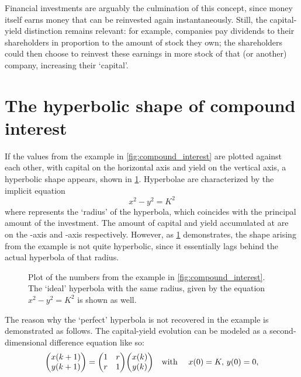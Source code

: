 Financial investments are arguably the culmination of this concept, since money itself earns money that can be reinvested again instantaneously. Still, the capital-yield distinction remains relevant: for example, companies pay dividends to their shareholders in proportion to the amount of stock they own; the shareholders could then choose to reinvest these earnings in more stock of that (or another) company, increasing their `capital'. %

\section{The hyperbolic shape of compound interest}
\label{sec:hyperbolic_interest}
If the values from the example in \cref{fig:compound_interest} are plotted against each other, with capital on the horizontal axis and yield on the vertical axis, a hyperbolic shape appears, shown in \cref{fig:hyperbolic_compounding}. Hyperbolae are characterized by the implicit equation 
\begin{equation}
    x^2 - y^2 = K^2
    \label{eq:hyperbola}
\end{equation}
where  represents the `radius' of the hyperbola, which coincides with the principal amount of the investment. The amount of capital and yield accumulated at are on the -axis and -axis respectively. However, as \cref{fig:hyperbolic_compounding} demonstrates, the shape arising from the example is not quite hyperbolic, since it essentially lags behind the actual hyperbola of that radius.
\begin{figure}[h!]
    \centering
    
    \caption{Plot of the numbers from the example in \cref{fig:compound_interest}. The `ideal' hyperbola with the same radius, given by the equation $x^2 - y^2 = K^2$ is shown as well.}
    \label{fig:hyperbolic_compounding}
\end{figure}
The reason why the `perfect' hyperbola is not recovered in the example is demonstrated as follows. The capital-yield evolution can be modeled as a second-dimensional difference equation like so:
$$ \mqty(x(k+1)\\y(k+1)) = \mqty(1& r \\ r & 1)\mqty(x(k)\\y(k))\qq{with }x(0) = K,\, y(0) = 0, $$
